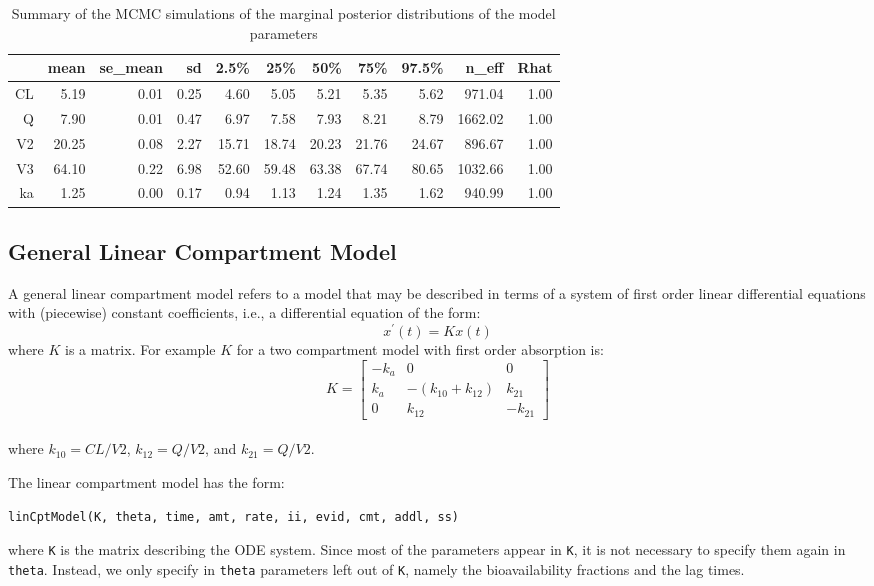 \documentclass[11pt]{amsart}
\begin{document}
\begin{table}[ht]
\centering
\caption{Summary of the MCMC simulations of the marginal posterior distributions of the model parameters}
\begin{tabular}{rrrrrrrrrrr}
  \hline
 & mean & se\_mean & sd & 2.5\% & 25\% & 50\% & 75\% & 97.5\% & n\_eff & Rhat \\ 
  \hline
CL & 5.19 & 0.01 & 0.25 & 4.60 & 5.05 & 5.21 & 5.35 & 5.62 & 971.04 & 1.00 \\ 
  Q & 7.90 & 0.01 & 0.47 & 6.97 & 7.58 & 7.93 & 8.21 & 8.79 & 1662.02 & 1.00 \\ 
  V2 & 20.25 & 0.08 & 2.27 & 15.71 & 18.74 & 20.23 & 21.76 & 24.67 & 896.67 & 1.00 \\ 
  V3 & 64.10 & 0.22 & 6.98 & 52.60 & 59.48 & 63.38 & 67.74 & 80.65 & 1032.66 & 1.00 \\ 
  ka & 1.25 & 0.00 & 0.17 & 0.94 & 1.13 & 1.24 & 1.35 & 1.62 & 940.99 & 1.00 \\ 
   \hline
\end{tabular}
\end{table}

\subsection*{General Linear Compartment Model}
A general linear compartment model refers to a model that may be described in terms of a system of first order linear differential equations with (piecewise) constant coefficients, i.e., a differential equation of the form:
$$ x^\prime\left(t\right) = Kx\left(t\right) $$
where $K$ is a matrix. For example $K$ for a two compartment model with first order absorption is:
$$   K = \left[\begin{array}{ccc}
	-k_a & 0 & 0 \\
	k_a & -\left(k_{10} + k_{12}\right) & k_{21} \\
	0 & k_{12} & -k_{21}
	\end{array}\right] $$ \\
where $k_{10} = CL / V2 $, $ k_{12} = Q / V2 $, and $k_{21} = Q / V2 $.

The linear compartment model has the form:

\texttt{linCptModel(K, theta, time, amt, rate, ii, evid, cmt, addl, ss)}

where \texttt{K} is the matrix describing the ODE system. Since most of the parameters appear in \texttt{K}, it is not necessary to specify them again in \texttt{theta}. Instead, we only specify in \texttt{theta} parameters left out of \texttt{K}, namely the bioavailability fractions and the lag times.
\end{document}
